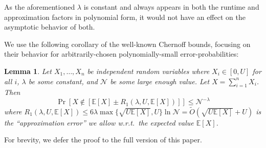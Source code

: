 \documentclass[letterpaper]{article} %
\newtheorem{lemma}[theorem]{Lemma}
\theoremstyle{definition}
\newcommand{\NN}{\mathcal{N}}
\newcommand{\EE}{\mathbb{E}}
\begin{document}
As the aforementioned $\lambda$ is constant and always appears in both the runtime and approximation factors in polynomial form, it would not have an effect on the asymptotic behavior of both.



We use the following corollary of the well-known Chernoff bounds, focusing on their behavior for arbitrarily-chosen polynomially-small error-probabilities:

\begin{lemma}\label{cor:2}
	Let $X_1,\ldots,X_n$ be independent random variables where $X_i \in [0,U]$ for all $i$, $\lambda$ be some constant, and $\NN$ be some large enough value. Let $X=\sum_{i=1}^n X_i$. Then
	\begin{equation*}
	\Pr[X \notin [\EE[X] \pm  R_1(\lambda, U,\EE[X]) ] ]
	\leq \NN^{-\lambda}
	\end{equation*}
	where $R_1(\lambda, U,\EE[X]) \leq 6\lambda \max\{\sqrt{U \EE[X]}, U\}\ln \NN =
	 \widetilde{O}(\sqrt{U \EE[X] } + U) $ is the ``approximation error'' we allow w.r.t.\ the expected value $\EE[X]$.
\end{lemma}
For brevity, we defer the proof to the full version of this paper.


\end{document}
